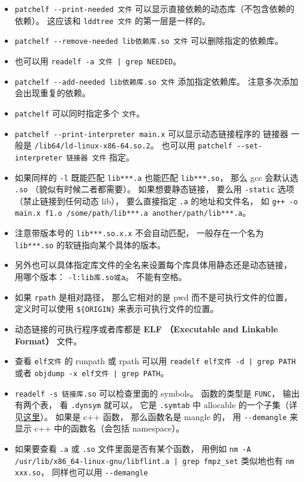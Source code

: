 \begin{itemize}
\item \verb|patchelf --print-needed 文件| 可以显示直接依赖的动态库（不包含依赖的依赖）。 这应该和 \verb|lddtree 文件| 的第一层是一样的。
\item \verb|patchelf --remove-needed lib依赖库.so 文件| 可以删除指定的依赖库。
\item 也可以用 \verb`readelf -a 文件 | grep NEEDED`。
\item \verb|patchelf --add-needed lib依赖库.so 文件| 添加指定依赖库。 注意多次添加会出现重复的依赖。
\item \verb|patchelf| 可以同时指定多个 \verb|文件|。
\item \verb|patchelf --print-interpreter main.x| 可以显示动态链接程序的 链接器 一般是 \verb|/lib64/ld-linux-x86-64.so.2|。 也可以用 \verb|patchelf --set-interpreter 链接器 文件| 指定。 
\item 如果同样的 \verb`-l` 既能匹配 \verb`lib***.a` 也能匹配 \verb`lib***.so`， 那么 gcc 会默认选 \verb`.so` （貌似有时候二者都需要）。 如果想要静态链接， 要么用 \verb`-static` 选项（禁止链接到任何动态 lib）， 要么直接指定 \verb`.a` 的地址和文件名， 如 \verb`g++ -o main.x f1.o /some/path/lib***.a another/path/lib***.a`。
\item 注意带版本号的 \verb|lib***.so.x.x| 不会自动匹配， 一般存在一个名为 \verb|lib***.so| 的软链指向某个具体的版本。
\item 另外也可以具体指定库文件的全名来设置每个库具体用静态还是动态链接， 用哪个版本： \verb|-l:lib库.so或a|。 不能有空格。
\item 如果 \verb|rpath| 是相对路径， 那么它相对的是 pwd 而不是可执行文件的位置， 定义时可以使用 \verb|${ORIGIN}| 来表示可执行文件的位置。
\item 动态链接的可执行程序或者库都是 \textbf{ELF （Executable and Linkable Format）} 文件。
\item 查看 \verb|elf文件| 的 runpath 或 rpath 可以用 \verb`readelf elf文件 -d | grep PATH` 或者 \verb`objdump -x elf文件 | grep PATH`。
\item \verb|readelf -s 链接库.so| 可以检查里面的 symbols。 函数的类型是 \verb|FUNC|， 输出有两个表， 看 \verb|.dynsym| 就可以， 它是 \verb|.symtab| 中 allocable 的一个子集（详见\href{https://blogs.oracle.com/solaris/post/inside-elf-symbol-tables}{这里}）。 如果是 c++ 函数， 那么函数名是 mangle 的， 用 \verb|--demangle| 来显示 c++ 中的函数名（会包括 namespace）。
\item 如果要查看 \verb|.a| 或 \verb|.so| 文件里面是否有某个函数， 用例如 \verb`nm -A /usr/lib/x86_64-linux-gnu/libflint.a | grep fmpz_set` 类似地也有 \verb|nm xxx.so|， 同样也可以用 \verb|--demangle|

\end{itemize}
